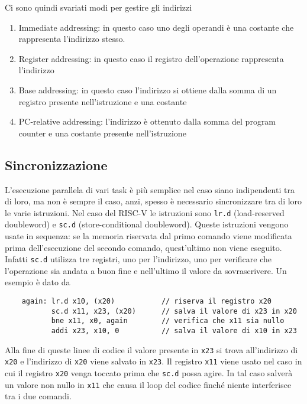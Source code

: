 \documentclass[a4paper,12pt]{article}
\theoremstyle{break}
\newcommand{\code}[1]{\texttt{#1}}
\numberwithin{equation}{section}
\begin{document}
Ci sono quindi svariati modi per gestire gli indirizzi 
\begin{enumerate}
    \item Immediate addressing: in questo caso uno degli operandi è una costante che rappresenta l'indirizzo stesso.
    \item Register addressing: in questo caso il registro dell'operazione rappresenta l'indirizzo
    \item Base addressing: in questo caso l'indirizzo si ottiene dalla somma di un registro presente nell'istruzione e una costante
    \item PC-relative addressing: l'indirizzo è ottenuto dalla somma del program counter e una costante presente nell'istruzione
\end{enumerate}
\subsection{Sincronizzazione}
L'esecuzione parallela di vari task è più semplice nel caso siano indipendenti tra di loro, ma non è sempre il caso, anzi, spesso è necessario sincronizzare tra di loro le varie istruzioni. 
Nel caso del RISC-V le istruzioni sono \code{lr.d} (load-reserved doubleword) e \code{sc.d} (store-conditional doubleword). Queste istruzioni vengono usate in sequenza: se la memoria riservata dal primo comando viene modificata prima dell'esecuzione del secondo comando, quest'ultimo non viene eseguito. Infatti \code{sc.d} utilizza tre registri, uno per l'indirizzo, uno per verificare che l'operazione sia andata a buon fine e nell'ultimo il valore da sovrascrivere. Un esempio è dato da 
\begin{verbatim}
    again: lr.d x10, (x20)           // riserva il registro x20
           sc.d x11, x23, (x20)      // salva il valore di x23 in x20
           bne x11, x0, again        // verifica che x11 sia nullo
           addi x23, x10, 0          // salva il valore di x10 in x23
\end{verbatim}
Alla fine di queste linee di codice il valore presente in \code{x23} si trova all'indirizzo di \code{x20} e l'indirizzo di \code{x20} viene salvato in \code{x23}. Il registro \code{x11} viene usato nel caso in cui il registro \code{x20} venga toccato prima che \code{sc.d} possa agire. In tal caso salverà un valore non nullo in \code{x11} che causa il loop del codice finché niente interferisce tra i due comandi.  
\end{document}

